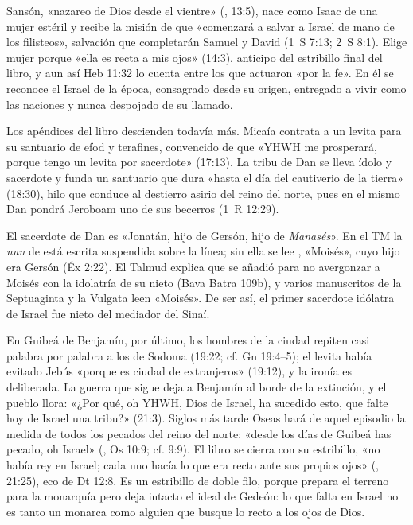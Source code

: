 Sansón, «nazareo de Dios desde el vientre» (, 13:5), nace como Isaac de una mujer estéril y recibe la misión de que «comenzará a salvar a Israel de mano de los filisteos», salvación que completarán Samuel y David (1~S 7:13; 2~S 8:1). Elige mujer porque «ella es recta a mis ojos» (14:3), anticipo del estribillo final del libro, y aun así Heb 11:32 lo cuenta entre los que actuaron «por la fe». En él se reconoce el Israel de la época, consagrado desde su origen, entregado a vivir como las naciones y nunca despojado de su llamado.

Los apéndices del libro descienden todavía más. Micaía contrata a un levita para su santuario de efod y terafines, convencido de que «YHWH me prosperará, porque tengo un levita por sacerdote» (17:13). La tribu de Dan se lleva ídolo y sacerdote y funda un santuario que dura «hasta el día del cautiverio de la tierra» (18:30), hilo que conduce al destierro asirio del reino del norte, pues en el mismo Dan pondrá Jeroboam uno de sus becerros (1~R 12:29).

\begin{nota}
El sacerdote de Dan es «Jonatán, hijo de Gersón, hijo de \emph{Manasés}». En el TM la \emph{nun} de  está escrita suspendida sobre la línea; sin ella se lee , «Moisés», cuyo hijo era Gersón (Éx 2:22). El Talmud explica que se añadió para no avergonzar a Moisés con la idolatría de su nieto (Bava Batra 109b), y varios manuscritos de la Septuaginta y la Vulgata leen «Moisés». De ser así, el primer sacerdote idólatra de Israel fue nieto del mediador del Sinaí.
\end{nota}

En Guibeá de Benjamín, por último, los hombres de la ciudad repiten casi palabra por palabra a los de Sodoma (19:22; cf. Gn 19:4--5); el levita había evitado Jebús «porque es ciudad de extranjeros» (19:12), y la ironía es deliberada. La guerra que sigue deja a Benjamín al borde de la extinción, y el pueblo llora: «¿Por qué, oh YHWH, Dios de Israel, ha sucedido esto, que falte hoy de Israel una tribu?» (21:3). Siglos más tarde Oseas hará de aquel episodio la medida de todos los pecados del reino del norte: «desde los días de Guibeá has pecado, oh Israel» (, Os 10:9; cf. 9:9). El libro se cierra con su estribillo, «no había rey en Israel; cada uno hacía lo que era recto ante sus propios ojos» (, 21:25), eco de Dt 12:8. Es un estribillo de doble filo, porque prepara el terreno para la monarquía pero deja intacto el ideal de Gedeón: lo que falta en Israel no es tanto un monarca como alguien que busque lo recto a los ojos de Dios.

